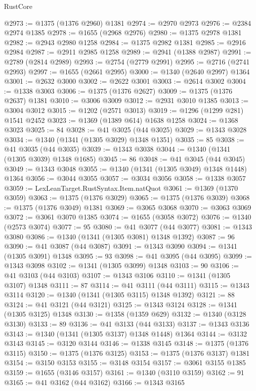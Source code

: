 \begin{lexlean}{RustCore}
\begin{coremodule}
@2973 := @1375 (@1376 @2960) @1381
@2974 := @2970 @2973
@2976 := @2384 @2974 @1385
@2978 := @1655 (@2968 @2976)
@2980 := @1375 @2978 @1381
@2982 := @2943 @2980 @1258
@2984 := @1375 @2982 @1381
@2985 := @2916 @2984
@2987 := @2911 @2985 @1258
@2989 := @2941 (@1388 @2987)
@2991 := @2789 (@2814 @2989)
@2993 := @2754 (@2779 @2991)
@2995 := @2716 (@2741 @2993)
@2997 := @1655 (@2661 @2995)
@3000 := @1340 (@2640 @2997) @1364
@3001 := @2632 @3000
@3002 := @2622 @3001
@3003 := @2614 @3002
@3004 := @1338 @3003
@3006 := @1375 (@1376 @2627)
@3009 := @1375 (@1376 @2637) @1381
@3010 := @3006 @3009
@3012 := @2931 @3010 @1385
@3013 := @3004 @3012
@3015 := @1202 (@2571 @3013)
@3019 := @1296 (@1299 @281) @1541 @2452
@3023 := @1369 (@1389 @614) @1638 @1258
@3024 := @1368 @3023
@3025 := 84
@3028 := @41 @3025 (@44 @3025)
@3029 := @1343 @3028
@3034 := @1340 (@1341 (@1305 @3029) @1348 @1351)
@3035 := 85
@3038 := @41 @3035 (@44 @3035)
@3039 := @1343 @3038
@3044 := @1340 (@1341 (@1305 @3039) @1348 @1685)
@3045 := 86
@3048 := @41 @3045 (@44 @3045)
@3049 := @1343 @3048
@3055 := @1340 (@1341 (@1305 @3049) @1348 @1448) @1364
@3056 := @3044 @3055
@3057 := @3034 @3056
@3058 := @1338 @3057
@3059 := LexLeanTarget.RustSyntax.Item.natQuot
@3061 := @1369 (@1370 @3059)
@3063 := @1375 (@1376 @3029)
@3065 := @1375 (@1376 @3039)
@3068 := @1375 (@1376 @3049) @1381
@3069 := @3065 @3068
@3070 := @3063 @3069
@3072 := @3061 @3070 @1385
@3074 := @1655 (@3058 @3072)
@3076 := @1340 (@2573 @3074)
@3077 := 95
@3080 := @41 @3077 (@44 @3077)
@3081 := @1343 @3080
@3086 := @1340 (@1341 (@1305 @3081) @1348 @1392)
@3087 := 96
@3090 := @41 @3087 (@44 @3087)
@3091 := @1343 @3090
@3094 := @1341 (@1305 @3091) @1348
@3095 := 93
@3098 := @41 @3095 (@44 @3095)
@3099 := @1343 @3098
@3102 := @1341 (@1305 @3099) @1348
@3103 := 90
@3106 := @41 @3103 (@44 @3103)
@3107 := @1343 @3106
@3110 := @1341 (@1305 @3107) @1348
@3111 := 87
@3114 := @41 @3111 (@44 @3111)
@3115 := @1343 @3114
@3120 := @1340 (@1341 (@1305 @3115) @1348 @1392)
@3121 := 88
@3124 := @41 @3121 (@44 @3121)
@3125 := @1343 @3124
@3128 := @1341 (@1305 @3125) @1348
@3130 := @1358 (@1359 @629)
@3132 := @1340 (@3128 @3130)
@3133 := 89
@3136 := @41 @3133 (@44 @3133)
@3137 := @1343 @3136
@3143 := @1340 (@1341 (@1305 @3137) @1348 @1448) @1364
@3144 := @3132 @3143
@3145 := @3120 @3144
@3146 := @1338 @3145
@3148 := @1375 (@1376 @3115)
@3150 := @1375 (@1376 @3125)
@3153 := @1375 (@1376 @3137) @1381
@3154 := @3150 @3153
@3155 := @3148 @3154
@3157 := @3061 @3155 @1385
@3159 := @1655 (@3146 @3157)
@3161 := @1340 (@3110 @3159)
@3162 := 91
@3165 := @41 @3162 (@44 @3162)
@3166 := @1343 @3165

\end{coremodule}
\end{lexlean}
